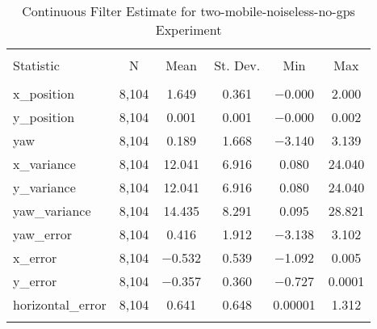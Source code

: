 
\begin{table}[h] \centering 
  \caption{Continuous Filter Estimate for two-mobile-noiseless-no-gps Experiment} 
  \label{tab:two_mobile_noiseless_no_gps_continuous_summary} 
\begin{tabular}{@{\extracolsep{5pt}}lccccc} 
\\[-1.8ex]\hline 
\hline \\[-1.8ex] 
Statistic & \multicolumn{1}{c}{N} & \multicolumn{1}{c}{Mean} & \multicolumn{1}{c}{St. Dev.} & \multicolumn{1}{c}{Min} & \multicolumn{1}{c}{Max} \\ 
\hline \\[-1.8ex] 
x\_position & 8,104 & 1.649 & 0.361 & $-$0.000 & 2.000 \\ 
y\_position & 8,104 & 0.001 & 0.001 & $-$0.000 & 0.002 \\ 
yaw & 8,104 & 0.189 & 1.668 & $-$3.140 & 3.139 \\ 
x\_variance & 8,104 & 12.041 & 6.916 & 0.080 & 24.040 \\ 
y\_variance & 8,104 & 12.041 & 6.916 & 0.080 & 24.040 \\ 
yaw\_variance & 8,104 & 14.435 & 8.291 & 0.095 & 28.821 \\ 
yaw\_error & 8,104 & 0.416 & 1.912 & $-$3.138 & 3.102 \\ 
x\_error & 8,104 & $-$0.532 & 0.539 & $-$1.092 & 0.005 \\ 
y\_error & 8,104 & $-$0.357 & 0.360 & $-$0.727 & 0.0001 \\ 
horizontal\_error & 8,104 & 0.641 & 0.648 & 0.00001 & 1.312 \\ 
\hline \\[-1.8ex] 
\end{tabular} 
\end{table} 
